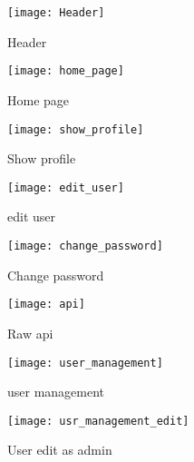 \documentclass{article}
\begin{document}
\begin{figure}[!h]
    \centering
    \texttt{[image: Header]}
    \caption{Header}
    \label{fig:header}
\end{figure}

\begin{figure}[!h]
    \centering
    \texttt{[image: home\_page]}
    \caption{Home page}
    \label{fig:home page}
\end{figure}

\begin{figure}[!h]
    \centering
    \texttt{[image: show\_profile]}
    \caption{Show profile}
    \label{fig:show_profile}
\end{figure}

\begin{figure}[!h]
    \centering
    \texttt{[image: edit\_user]}
    \caption{edit user}
    \label{fig:edit profile}
\end{figure}

\begin{figure}[!h]
    \centering
    \texttt{[image: change\_password]}
    \caption{Change password}
    \label{fig:Change password}
\end{figure}

\begin{figure}[!h]
    \centering
    \texttt{[image: api]}
    \caption{Raw api}
    \label{fig:raw api}
\end{figure}

\begin{figure}[!h]
    \centering
    \texttt{[image: user\_management]}
    \caption{user management}
    \label{fig:user management}
\end{figure}

\begin{figure}[!h]
    \centering
    \texttt{[image: usr\_management\_edit]}
    \caption{User edit as admin}
    \label{fig:usr_management_edit}
\end{figure}
\end{document}

